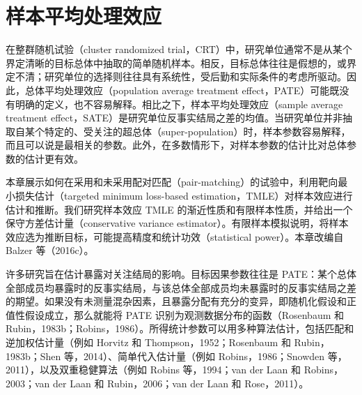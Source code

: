 \chapter{样本平均处理效应}
\begingroup
\raggedbottom
{}

在整群随机试验（cluster randomized trial，CRT）中，研究单位通常不是从某个界定清晰的目标总体中抽取的简单随机样本。相反，目标总体往往是假想的，或界定不清；研究单位的选择则往往具有系统性，受后勤和实际条件的考虑所驱动。因此，总体平均处理效应（population average treatment effect，PATE）可能既没有明确的定义，也不容易解释。相比之下，样本平均处理效应（sample average treatment effect，SATE）是研究单位反事实结局之差的均值。当研究单位并非抽取自某个特定的、受关注的超总体（super-population）时，样本参数容易解释，而且可以说是最相关的参数。此外，在多数情形下，对样本参数的估计比对总体参数的估计更有效。

\begin{sourcebox}
本章展示如何在采用和未采用配对匹配（pair-matching）的试验中，利用靶向最小损失估计（targeted minimum loss-based estimation，TMLE）对样本效应进行估计和推断。我们研究样本效应 TMLE 的渐近性质和有限样本性质，并给出一个保守方差估计量（conservative variance estimator）。有限样本模拟说明，将样本效应选为推断目标，可能提高精度和统计功效（statistical power）。本章改编自 Balzer 等（2016c）。
\end{sourcebox}

许多研究旨在估计暴露对关注结局的影响。目标因果参数往往是 PATE：某个总体全部成员均暴露时的反事实结局，与该总体全部成员均未暴露时的反事实结局之差的期望。如果没有未测量混杂因素，且暴露分配有充分的变异，即随机化假设和正值性假设成立，那么就能将 PATE 识别为观测数据分布的函数（Rosenbaum 和 Rubin，1983b；Robins，1986）。所得统计参数可以用多种算法估计，包括匹配和逆加权估计量（例如 Horvitz 和 Thompson，1952；Rosenbaum 和 Rubin，1983b；Shen 等，2014）、简单代入估计量（例如 Robins，1986；Snowden 等，2011），以及双重稳健算法（例如 Robins 等，1994；van der Laan 和 Robins，2003；van der Laan 和 Rubin，2006；van der Laan 和 Rose，2011）。


